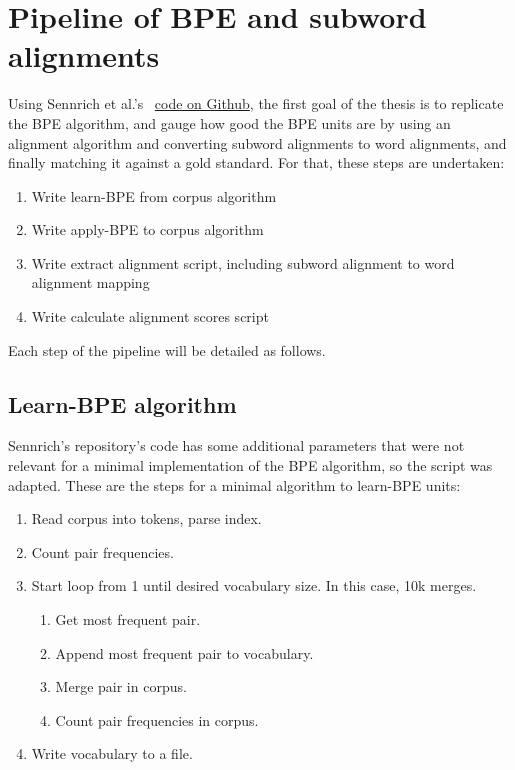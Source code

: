 \section{Pipeline of BPE and subword alignments}

Using Sennrich et al.'s~\cite{sennrich2015neural} \href{https://github.com/rsennrich/subword-nmt/}{code on Github}, the first goal of the thesis is to replicate the BPE algorithm, and gauge how good the BPE units are by using an alignment algorithm and converting subword alignments to word alignments, and finally matching it against a gold standard. For that, these steps are undertaken:

\begin{enumerate}
	\item Write learn-BPE from corpus algorithm
	\item Write apply-BPE to corpus algorithm
	\item Write extract alignment script, including subword alignment to word alignment mapping
	\item Write calculate alignment scores script
\end{enumerate}

Each step of the pipeline will be detailed as follows.

\subsection{Learn-BPE algorithm}\label{met:learnbpe}

Sennrich's repository's code has some additional parameters that were not relevant for a minimal implementation of the BPE algorithm, so the script was adapted. These are the steps for a minimal algorithm to learn-BPE units:

\begin{enumerate}
	\item Read corpus into tokens, parse index.
	\item Count pair frequencies.
	\item Start loop from 1 until desired vocabulary size. In this case, 10k merges.
	\begin{enumerate}
		\item Get most frequent pair.
		\item Append most frequent pair to vocabulary.
		\item Merge pair in corpus.
		\item Count pair frequencies in corpus.
	\end{enumerate}
	\item Write vocabulary to a file.
\end{enumerate}

